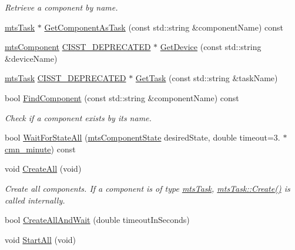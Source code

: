 \begin{DoxyCompactItemize}
\begin{DoxyCompactList}\small\item\em Retrieve a component by name. \end{DoxyCompactList}\item 
\hyperlink{classmts_task}{mts\+Task} $\ast$ \hyperlink{classmts_manager_local_abcc591187a95da4dfddcdc70f340e2c1}{Get\+Component\+As\+Task} (const std\+::string \&component\+Name) const 
\item 
\hyperlink{classmts_component}{mts\+Component} \hyperlink{cmn_portability_8h_a63da7164735f9501be651b1f2bbc0121}{C\+I\+S\+S\+T\+\_\+\+D\+E\+P\+R\+E\+C\+A\+T\+E\+D} $\ast$ \hyperlink{classmts_manager_local_a8bc0276a100b36b06f5088a7f0d04240}{Get\+Device} (const std\+::string \&device\+Name)
\item 
\hyperlink{classmts_task}{mts\+Task} \hyperlink{cmn_portability_8h_a63da7164735f9501be651b1f2bbc0121}{C\+I\+S\+S\+T\+\_\+\+D\+E\+P\+R\+E\+C\+A\+T\+E\+D} $\ast$ \hyperlink{classmts_manager_local_ac128c1f6173b6d4dbe6002106103c5bb}{Get\+Task} (const std\+::string \&task\+Name)
\item 
bool \hyperlink{classmts_manager_local_afc2ea63402479809aa1c72609b8d52b9}{Find\+Component} (const std\+::string \&component\+Name) const 
\begin{DoxyCompactList}\small\item\em Check if a component exists by its name. \end{DoxyCompactList}\item 
bool \hyperlink{classmts_manager_local_a0ae805235f0e479c0c150d7a0999a1e0}{Wait\+For\+State\+All} (\hyperlink{classmts_component_state}{mts\+Component\+State} desired\+State, double timeout=3. $\ast$\hyperlink{cmn_units_8h_a212c64aa2bb4e6ff3d78943569e1b58c}{cmn\+\_\+minute}) const 
\item 
void \hyperlink{classmts_manager_local_a5266feade3df21c28176d03048d8178d}{Create\+All} (void)
\begin{DoxyCompactList}\small\item\em Create all components. If a component is of type \hyperlink{classmts_task}{mts\+Task}, \hyperlink{classmts_task_abc1a625d025c1038fa48137f0ba53465}{mts\+Task\+::\+Create()} is called internally. \end{DoxyCompactList}\item 
bool \hyperlink{classmts_manager_local_a8bfe1cff79e11fa60a2354a3b5ac279b}{Create\+All\+And\+Wait} (double timeout\+In\+Seconds)
\item 
void \hyperlink{classmts_manager_local_a2c7b41b02521fa73490b70c575c3803b}{Start\+All} (void)

\end{DoxyCompactItemize}
